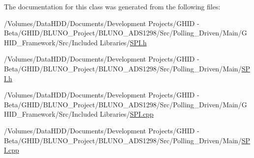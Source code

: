 \-The documentation for this class was generated from the following files\-:\begin{DoxyCompactItemize}
\item 
/\-Volumes/\-Data\-H\-D\-D/\-Documents/\-Development Projects/\-G\-H\-I\-D -\/ Beta/\-G\-H\-I\-D/\-B\-L\-U\-N\-O\-\_\-\-Project/\-B\-L\-U\-N\-O\-\_\-\-A\-D\-S1298/\-Src/\-Polling\-\_\-\-Driven/\-Main/\-G\-H\-I\-D\-\_\-\-Framework/\-Src/\-Included Libraries/\hyperlink{_g_h_i_d___framework_2_src_2_included_01_libraries_2_s_p_i_8h}{\-S\-P\-I.\-h}\item 
/\-Volumes/\-Data\-H\-D\-D/\-Documents/\-Development Projects/\-G\-H\-I\-D -\/ Beta/\-G\-H\-I\-D/\-B\-L\-U\-N\-O\-\_\-\-Project/\-B\-L\-U\-N\-O\-\_\-\-A\-D\-S1298/\-Src/\-Polling\-\_\-\-Driven/\-Main/\hyperlink{_s_p_i_8h}{\-S\-P\-I.\-h}\item 
/\-Volumes/\-Data\-H\-D\-D/\-Documents/\-Development Projects/\-G\-H\-I\-D -\/ Beta/\-G\-H\-I\-D/\-B\-L\-U\-N\-O\-\_\-\-Project/\-B\-L\-U\-N\-O\-\_\-\-A\-D\-S1298/\-Src/\-Polling\-\_\-\-Driven/\-Main/\-G\-H\-I\-D\-\_\-\-Framework/\-Src/\-Included Libraries/\hyperlink{_g_h_i_d___framework_2_src_2_included_01_libraries_2_s_p_i_8cpp}{\-S\-P\-I.\-cpp}\item 
/\-Volumes/\-Data\-H\-D\-D/\-Documents/\-Development Projects/\-G\-H\-I\-D -\/ Beta/\-G\-H\-I\-D/\-B\-L\-U\-N\-O\-\_\-\-Project/\-B\-L\-U\-N\-O\-\_\-\-A\-D\-S1298/\-Src/\-Polling\-\_\-\-Driven/\-Main/\hyperlink{_s_p_i_8cpp}{\-S\-P\-I.\-cpp}\end{DoxyCompactItemize}
